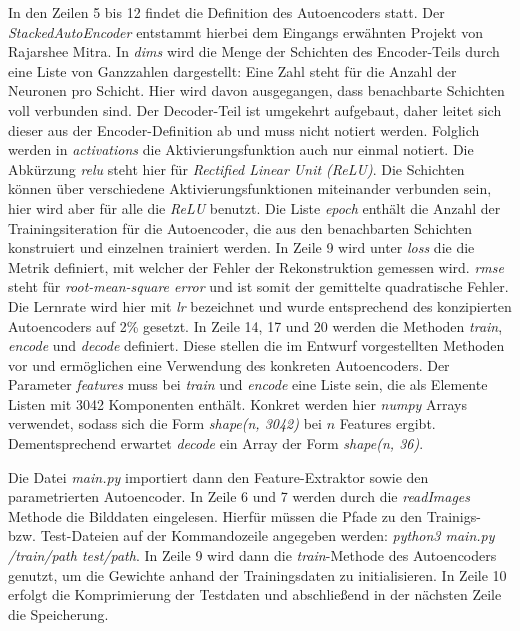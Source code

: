 In den Zeilen 5 bis 12 findet die Definition des Autoencoders statt. Der \textit{StackedAutoEncoder} entstammt hierbei dem Eingangs erwähnten Projekt von Rajarshee Mitra. In \textit{dims} wird die Menge der Schichten des Encoder-Teils durch eine Liste von Ganzzahlen dargestellt: Eine Zahl steht für die Anzahl der Neuronen pro Schicht. Hier wird davon ausgegangen, dass benachbarte Schichten voll verbunden sind. Der Decoder-Teil ist umgekehrt aufgebaut, daher leitet sich dieser aus der Encoder-Definition ab und muss nicht notiert werden. Folglich werden in \textit{activations} die Aktivierungsfunktion auch nur einmal notiert. 
Die Abkürzung \textit{relu} steht hier für \textit{Rectified Linear Unit (ReLU)}. Die Schichten können über verschiedene Aktivierungsfunktionen miteinander verbunden sein, hier wird aber für alle die \textit{ReLU} benutzt.
Die Liste \textit{epoch} enthält die Anzahl der Trainingsiteration für die Autoencoder, die aus den benachbarten Schichten konstruiert und einzelnen trainiert werden. In Zeile 9 wird unter \textit{loss} die die Metrik definiert, mit welcher der Fehler der Rekonstruktion gemessen wird. \textit{rmse} steht für \textit{root-mean-square error} und ist somit der gemittelte quadratische Fehler. 
Die Lernrate wird hier mit \textit{lr} bezeichnet und wurde entsprechend des konzipierten Autoencoders auf 2\% gesetzt.\newline
In Zeile 14, 17 und 20 werden die Methoden \textit{train}, \textit{encode} und \textit{decode} definiert. Diese stellen die im Entwurf vorgestellten Methoden vor und ermöglichen eine Verwendung des konkreten Autoencoders. Der Parameter \textit{features} muss bei \textit{train} und \textit{encode} eine Liste sein, die als Elemente Listen mit 3042 Komponenten enthält. Konkret werden hier \textit{numpy} Arrays verwendet, sodass sich die Form \textit{shape(n, 3042)} bei $n$ Features ergibt. Dementsprechend erwartet \textit{decode} ein Array der Form \textit{shape(n, 36)}.\newline

Die Datei \textit{main.py} importiert dann den Feature-Extraktor sowie den parametrierten Autoencoder. In Zeile 6 und 7 werden durch die \textit{readImages} Methode die Bilddaten eingelesen. Hierfür müssen die Pfade zu den Trainigs- bzw. Test-Dateien auf der Kommandozeile angegeben werden: \textit{python3 main.py /train/path test/path}. In Zeile 9 wird dann die \textit{train}-Methode des Autoencoders genutzt, um die Gewichte anhand der Trainingsdaten zu initialisieren. In Zeile 10 erfolgt die Komprimierung der Testdaten und abschließend in der nächsten Zeile die Speicherung.


